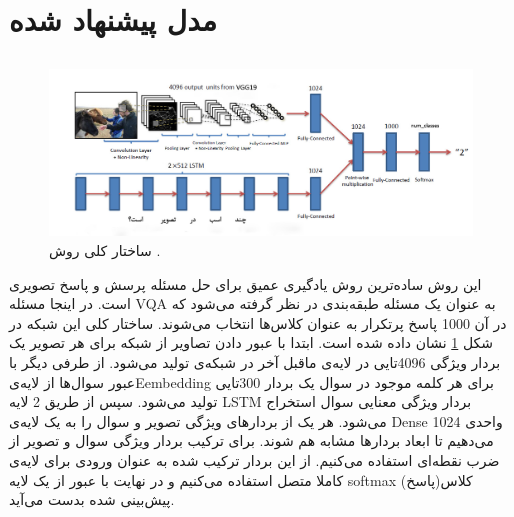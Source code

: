 \section{مدل پیشنهاد شده}
{
	\subsection{}
	{
		\begin{figure}
			\centering
			\includegraphics[scale=0.4]{images/Vanilla_Network.jpg}
			\caption{ساختار کلی روش   .}
			\label{fig:3}
		\end{figure}
		این روش ساده‌ترین روش یادگیری عمیق برای حل مسئله پرسش و پاسخ تصویری است. در اینجا مسئله VQA به عنوان یک مسئله طبقه‌بندی در نظر گرفته می‌شود که در آن 1000 پاسخ پرتکرار به عنوان کلاس‌ها انتخاب می‌شوند.  ساختار کلی این شبکه در شکل 
		\ref{fig:3}
		نشان داده شده است. ابتدا با عبور دادن تصاویر از شبکه 
		 برای هر تصویر یک بردار ویژگی 4096تایی در لایه‌ی ماقبل آخر در شبکه‌ی
		   تولید می‌شود. از طرفی دیگر با عبور سوال‌ها از لایه‌یEembedding برای هر کلمه موجود در سوال یک بردار 300تایی تولید می‌شود. سپس از طریق 2 لایه LSTM بردار ویژگی معنایی سوال استخراج  می‌شود. هر یک از بردارهای ویژگی تصویر و سوال را به یک لایه‌ی Dense  1024 واحدی می‌دهیم تا ابعاد بردار‌ها مشابه هم شوند. برای ترکیب بردار ویژگی سوال و تصویر از ضرب نقطه‌ای استفاده می‌کنیم. از این بردار ترکیب شده به عنوان ورودی برای لایه‌ی کاملا متصل استفاده می‌کنیم و در نهایت با عبور از یک لایه softmax کلاس(پاسخ) پیش‌بینی شده بدست می‌آید.
	}

}
